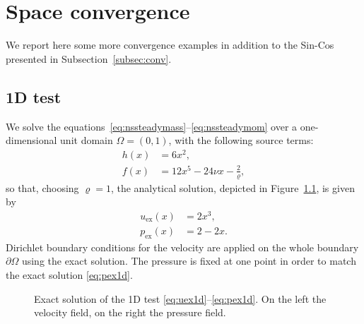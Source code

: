 \appendix
\renewcommand{\chaptername}{Appendix}
\chapter{Space convergence} \label{app:conv}
We report here some more convergence examples in addition to the Sin-Cos 
presented in Subsection~\ref{subsec:conv}.
%
\section{1D test}
We solve the equations~\eqref{eq:nssteadymass}--\eqref{eq:nssteadymom} over a 
one-dimensional unit domain $\Omega=(0,1)$, with the following source terms:
\begin{align}
	h(x) &= 6x^2,\\
	f(x) &= 12x^5 - 24\nu x - \frac{2}{\varrho}, %
\end{align}
so that, choosing $\varrho=1$, the analytical solution, depicted in 
Figure~\ref{fig:1dexact}, is given by
\begin{align}
\label{eq:uex1d}	u_\text{ex}(x) &= 2x^3,\\
\label{eq:pex1d}	p_\text{ex}(x) &= 2-2x.
\end{align}
Dirichlet boundary conditions for the velocity are applied on the whole 
boundary $\partial \Omega$ using the exact solution. The pressure is fixed at 
one point in order to match the exact solution \eqref{eq:pex1d}.
\begin{figure}
	\centering
	\caption[Exact solution of the 1D test]{Exact solution of the 1D test 
	\eqref{eq:uex1d}--\eqref{eq:pex1d}. On 
	the left the velocity field, on the right the pressure field.}
	\label{fig:1dexact}
\end{figure}

